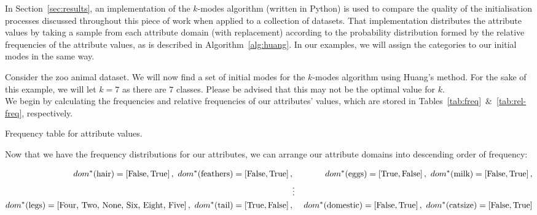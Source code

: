 In Section~\ref{sec:results}, an implementation of the \(k\)-modes algorithm 
(written in Python) is used to compare the quality of the initialisation 
processes discussed throughout this piece of work when applied to a collection 
of datasets. That implementation distributes the attribute values by taking a
sample from each attribute domain (with replacement) according to the 
probability distribution formed by the relative frequencies of the attribute
values, as is described in Algorithm~\ref{alg:huang}. In our examples, we will
assign the categories to our initial modes in the same way.\\

\begin{example}\label{ex:huang}
    Consider the zoo animal dataset. We will now find a set of initial modes for
    the \(k\)-modes algorithm using Huang's method. For the sake of this
    example, we will let \(k = 7\) as there are \(7\) classes. Please be advised
    that this may not be the optimal value for \(k\).\\
    
    We begin by calculating the frequencies and relative frequencies of our 
    attributes' values, which are stored in 
    Tables~\ref{tab:freq}~\&~\ref{tab:rel-freq}, respectively.

    \begin{table}[h]
    \resizebox{\textwidth}{!}{%
        
    }
    \caption{Frequency table for attribute values.}\label{tab:freq}
    \end{table}

    Now that we have the frequency distributions for our attributes, we can
    arrange our attribute domains into descending order of frequency:
    
    \begin{equation}
    \begin{aligned}
    \nonumber
    \centering
        dom^*(\text{hair}) = \left[\false, \true\right], \
        dom^*(\text{feathers}) = \left[\false, \true \right], & \ &
        dom^*(\text{eggs}) = \left[\true, \false\right], \
        dom^*(\text{milk}) = \left[\false, \true\right],
        \\
        {} & \vdots & {}
        \\
        dom^*(\text{legs}) = \left[\text{Four, Two, None, Six, Eight, 
        Five}\right], \
        dom^*(\text{tail}) = \left[\true, \false\right], & \ &
        dom^*(\text{domestic}) = \left[\false, \true\right], \
        dom^*(\text{catsize}) = \left[\false, \true\right]
        \\
    \end{aligned}
    \end{equation}


\end{example}
